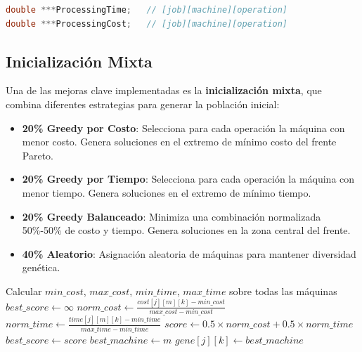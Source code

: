 \documentclass[preprint,12pt,authoryear]{elsarticle}
\begin{document}
\begin{lstlisting}[language=C, caption=Matrices de datos del problema]
double ***ProcessingTime;   // [job][machine][operation]
double ***ProcessingCost;   // [job][machine][operation]
\end{lstlisting}

\subsection{Inicialización Mixta}

Una de las mejoras clave implementadas es la \textbf{inicialización mixta}, que combina diferentes estrategias para generar la población inicial:

\begin{itemize}
    \item \textbf{20\% Greedy por Costo}: Selecciona para cada operación la máquina con menor costo. Genera soluciones en el extremo de mínimo costo del frente Pareto.
    
    \item \textbf{20\% Greedy por Tiempo}: Selecciona para cada operación la máquina con menor tiempo. Genera soluciones en el extremo de mínimo tiempo.
    
    \item \textbf{20\% Greedy Balanceado}: Minimiza una combinación normalizada 50\%-50\% de costo y tiempo. Genera soluciones en la zona central del frente.
    
    \item \textbf{40\% Aleatorio}: Asignación aleatoria de máquinas para mantener diversidad genética.
\end{itemize}

\begin{algorithm}[h]
\caption{Inicialización Greedy Balanceada}
\begin{algorithmic}[1]
        \STATE Calcular $min\_cost$, $max\_cost$, $min\_time$, $max\_time$ sobre todas las máquinas
        \STATE $best\_score \leftarrow \infty$
            \STATE $norm\_cost \leftarrow \frac{cost[j][m][k] - min\_cost}{max\_cost - min\_cost}$
            \STATE $norm\_time \leftarrow \frac{time[j][m][k] - min\_time}{max\_time - min\_time}$
            \STATE $score \leftarrow 0.5 \times norm\_cost + 0.5 \times norm\_time$
                \STATE $best\_score \leftarrow score$
                \STATE $best\_machine \leftarrow m$
            \ENDIF
        \ENDFOR
        \STATE $gene[j][k] \leftarrow best\_machine$
    \ENDFOR
\ENDFOR
\end{algorithmic}
\end{algorithm}
\end{document}
